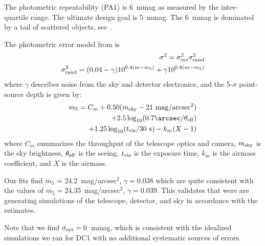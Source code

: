 \documentclass[\docopts]{\docclass}
\begin{document}
The photometric repeatability (PA1) is 6~mmag as measured by the inter-quartile range.  The ultimate design goal is 5~mmag.  The 6~mmag is dominated by a tail of scattered objects, see .

The photometric error model from \citet[][Eq. 6,7]{Ivezic08} is
\begin{eqnarray}
\sigma^2 = \sigma^2_{\rm sys} \sigma^2_{\rm rand} \\
\sigma^2_{\rm rand} = (0.04 - \gamma) 10^{0.4(m-m_5)} + \gamma 10^{0.8(m-m_5)}
\label{eq:photometric_error}
\end{eqnarray}
where $\gamma$ describes noise from the sky and detector electronics, and the 5-$\sigma$ point-source depth is given by:
\begin{equation}
\begin{split}
m_5 = C_m + 0.50 (m_{\rm sky} - 21~{\rm mag/{\rm arcsec}^2}) \\
+ 2.5 \log_{10} (0.7{\arcsec}/\theta_{\rm eff}) \\
+ 1.25 \log_{10} (t_{\rm vis} / 30~{\rm s}) - k_m (X-1)
\label{eq:photometric_m5}
\end{split}
\end{equation}
where $C_m$ summarizes the throughput of the telescope optics and camera, $m_{\rm sky}$ is the sky brightness, $\theta_{\rm eff}$ is the seeing, $t_{\rm vis}$ is the exposure time, $k_m$ is the airmass coefficient, and $X$ is the airmass.

Our fits find $m_5$ = 24.2~mag/arcsec$^2$, $\gamma=0.038$ which are quite consistent with the \citet[][Table 2]{Ivezic08} values of $m_5=24.35$~mag/arcsec$^2$, $\gamma=0.039$.  This validates that were are generating simulations of the telescope, detector, and sky in accordance with the \citet{Ivezic08} estimates.

Note that we find $\sigma_{\rm sys}=0$~mmag, which is consistent with the idealized simulations we ran for DC1 with no additional systematic sources of errors.
\end{document}
